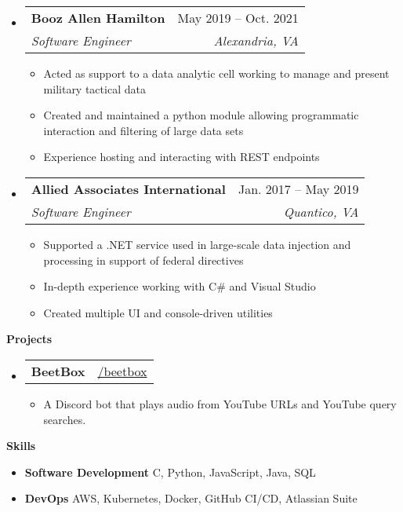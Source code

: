 \documentclass[letterpaper,12pt]{article}[leftmargin=*]
\makeatletter
\def \githubicon {\faGithub}
\def \entryspacing {-0pt}
\renewcommand{\section}[2]{\vspace{5pt}
  \colorbox{secondary}{\color{white}\raggedbottom\normalsize\textbf{{#1}{\hspace{7pt}#2}}}
}
\newcommand{\resumeEntryStart}{\begin{itemize}[leftmargin=2.5mm]}
\newcommand{\resumeEntryEnd}{\end{itemize}\vspace{\entryspacing}}
\newcommand{\resumeItemListStart}{\begin{itemize}[leftmargin=4.5mm]}
\newcommand{\resumeItemListEnd}{\end{itemize}}
\newcommand{\resumeItem}[1]{
  \item\small{
    {#1 \vspace{-2pt}}
  }
}
\newcommand{\resumeEntryTSDL}[4]{
  \vspace{-1pt}\item[]
    \begin{tabularx}{0.97\textwidth}{X@{\hspace{60pt}}r}
      \textbf{\color{primary}#1} & {\firabook\color{accent}\small#2} \\
      \textit{\color{accent}\small#3} & \textit{\color{accent}\small#4} \\
    \end{tabularx}\vspace{-6pt}
}
\newcommand{\resumeEntryTD}[2]{
  \vspace{-1pt}\item[]
    \begin{tabularx}{0.97\textwidth}{X@{\hspace{60pt}}r}
      \textbf{\color{primary}#1} & {\firabook\color{accent}\small#2} \\
    \end{tabularx}\vspace{-6pt}
}
\newcommand{\resumeEntryS}[2]{
  \item[]\small{
    \textbf{\color{primary}#1 }{ #2 \vspace{-6pt}}
  }
}
\makeatother
\begin{document}
  \resumeEntryStart
    \resumeEntryTSDL
      {Booz Allen Hamilton}{May 2019 -- Oct. 2021}
      {Software Engineer}{Alexandria, VA}
    \resumeItemListStart
        \resumeItem {Acted as support to a data analytic cell working to manage and present military tactical data}
        \resumeItem {Created and maintained a python module allowing programmatic interaction and filtering of large data sets}
        \resumeItem {Experience hosting and interacting with REST endpoints}
    \resumeItemListEnd
  \resumeEntryEnd

  \resumeEntryStart
    \resumeEntryTSDL
      {Allied Associates International}{Jan. 2017 -- May 2019}
      {Software Engineer}{Quantico, VA}
    \resumeItemListStart
      \resumeItem {Supported a .NET service used in large-scale data injection and processing in support of federal directives}
      \resumeItem {In-depth experience working with C\# and Visual Studio}
      \resumeItem {Created multiple UI and console-driven utilities}
    \resumeItemListEnd
  \resumeEntryEnd


\section{\faFlask}{Projects}

  \resumeEntryStart
    \resumeEntryTD {BeetBox}{\githubicon \hspace{3pt}\href{https://github.com/BeetBox-Bot/BeetBox}{/beetbox}}
    \resumeItemListStart
      \resumeItem {A Discord bot that plays audio from YouTube URLs and YouTube query searches.}
    \resumeItemListEnd
  \resumeEntryEnd

\section{\faGears}{Skills}
 \resumeEntryStart
  \resumeEntryS{Software Development} {C, Python, JavaScript, Java, SQL}
  \resumeEntryS{DevOps} {AWS, Kubernetes, Docker, GitHub CI/CD, Atlassian Suite}
 \resumeEntryEnd
\end{document}
